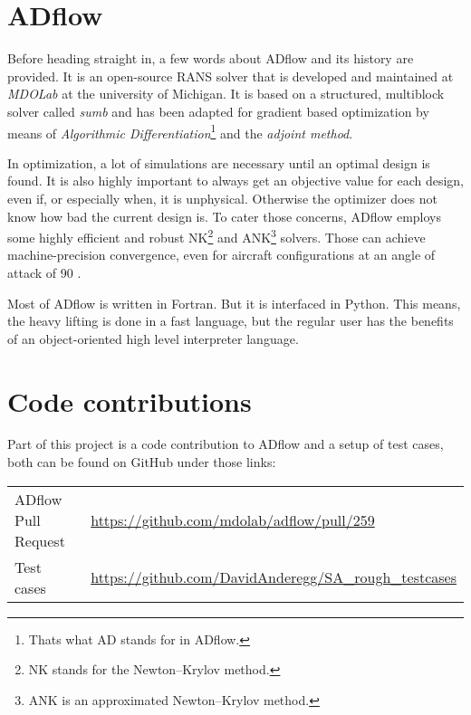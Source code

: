 \section{ADflow}
Before heading straight in, a few words about ADflow and its history are
provided. It is an open-source RANS solver that is developed and maintained at
\textit{MDOLab} at the university of Michigan. It is based on a structured,
multiblock solver called
\textit{sumb} and has been adapted for gradient based optimization by means of
\textit{Algorithmic Differentiation}\footnote{Thats what AD stands for in
ADflow.} and the \textit{adjoint method}.

In optimization, a lot of simulations are necessary until an optimal design is
found. It is also highly important to always get an objective value for each
design, even if, or especially when, it is unphysical. Otherwise the optimizer
does not know how bad the current design is. To cater those concerns, ADflow
employs some highly efficient and robust NK\footnote{NK stands for the
Newton–Krylov method.} and ANK\footnote{ANK is an approximated Newton–Krylov
method.} solvers. Those can achieve machine-precision convergence, even for
aircraft configurations at an angle of attack of 90\degree
\cite{Mader2020a} \cite{Kenway2019a} \cite{Yildirim2019b}.


Most of ADflow is written in Fortran. But it is interfaced in Python. This means,
the heavy lifting is done in a fast language, but the regular user has the
benefits of an object-oriented high level interpreter language.

\section{Code contributions}
Part of this project is a code contribution to ADflow and a setup of test cases,
both can be found on GitHub under those links:\\


\begin{tabular}{l l}
  ADflow Pull Request & \url{https://github.com/mdolab/adflow/pull/259} \\
  Test cases & \url{https://github.com/DavidAnderegg/SA_rough_testcases}
\end{tabular}
